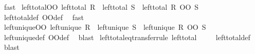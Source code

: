 \begin{isabellebody}
\ fast%
\endisatagproof
{\isafoldproof}%
%
\isadelimproof
\isanewline
%
\endisadelimproof
\isanewline
{}\isamarkupfalse%
\ left{\isacharunderscore}{\kern0pt}total{\isacharunderscore}{\kern0pt}OO{\isacharcolon}{\kern0pt}\ {\isachardoublequoteopen}left{\isacharunderscore}{\kern0pt}total\ R\ {\isasymLongrightarrow}\ left{\isacharunderscore}{\kern0pt}total\ S\ {\isasymLongrightarrow}\ left{\isacharunderscore}{\kern0pt}total\ {\isacharparenleft}{\kern0pt}R\ OO\ S{\isacharparenright}{\kern0pt}{\isachardoublequoteclose}\isanewline
%
\isadelimproof
\ \ %
\endisadelimproof
%
\isatagproof
{}\isamarkupfalse%
\ left{\isacharunderscore}{\kern0pt}total{\isacharunderscore}{\kern0pt}def\ OO{\isacharunderscore}{\kern0pt}def\ \isamarkupfalse%
\ fast%
\endisatagproof
{\isafoldproof}%
%
\isadelimproof
\isanewline
%
\endisadelimproof
\isanewline
{}\isamarkupfalse%
\ left{\isacharunderscore}{\kern0pt}unique{\isacharunderscore}{\kern0pt}OO{\isacharcolon}{\kern0pt}\ {\isachardoublequoteopen}left{\isacharunderscore}{\kern0pt}unique\ R\ {\isasymLongrightarrow}\ left{\isacharunderscore}{\kern0pt}unique\ S\ {\isasymLongrightarrow}\ left{\isacharunderscore}{\kern0pt}unique\ {\isacharparenleft}{\kern0pt}R\ OO\ S{\isacharparenright}{\kern0pt}{\isachardoublequoteclose}\isanewline
%
\isadelimproof
\ \ %
\endisadelimproof
%
\isatagproof
{}\isamarkupfalse%
\ left{\isacharunderscore}{\kern0pt}unique{\isacharunderscore}{\kern0pt}def\ OO{\isacharunderscore}{\kern0pt}def\ \isamarkupfalse%
\ blast%
\endisatagproof
{\isafoldproof}%
%
\isadelimproof
%
\endisadelimproof
%
\isadelimdocument
%
\endisadelimdocument
%
\isatagdocument
%
\isamarkuptrue%
%
\endisatagdocument
{\isafolddocument}%
%
\isadelimdocument
%
\endisadelimdocument
{}\isamarkupfalse%
\ left{\isacharunderscore}{\kern0pt}total{\isacharunderscore}{\kern0pt}eq{\isacharbrackleft}{\kern0pt}transfer{\isacharunderscore}{\kern0pt}rule{\isacharbrackright}{\kern0pt}{\isacharcolon}{\kern0pt}\ {\isachardoublequoteopen}left{\isacharunderscore}{\kern0pt}total\ {\isacharparenleft}{\kern0pt}{\isacharequal}{\kern0pt}{\isacharparenright}{\kern0pt}{\isachardoublequoteclose}\isanewline
%
\isadelimproof
\ \ %
\endisadelimproof
%
\isatagproof
{}\isamarkupfalse%
\ left{\isacharunderscore}{\kern0pt}total{\isacharunderscore}{\kern0pt}def\ \isamarkupfalse%
\ blast%
\endisatagproof
{\isafoldproof}%
%
\isadelimproof
\isanewline
%
\endisadelimproof
\isanewline
{}\isamarkupfalse%

\end{isabellebody}
